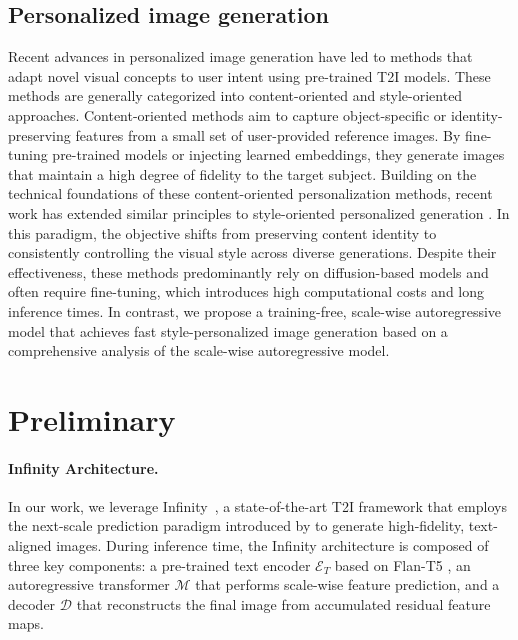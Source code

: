 \documentclass[10pt,twocolumn,letterpaper]{article}
\begin{document}
\subsection{Personalized image generation}
Recent advances in personalized image generation have led to methods that adapt novel visual concepts to user intent using pre-trained T2I models. These methods are generally categorized into content-oriented and style-oriented approaches. Content-oriented methods \cite{ruiz2023dreambooth, li2023blip, wei2023elite, li2024photomaker} aim to capture object-specific or identity-preserving features from a small set of user-provided reference images. By fine-tuning pre-trained models or injecting learned embeddings, they generate images that maintain a high degree of fidelity to the target subject.
Building on the technical foundations of these content-oriented personalization methods, recent work has extended similar principles to style-oriented personalized generation \cite{sohn2023styledrop, frenkel2024implicitstylecontentseparationusing, shah2023ziplorasubjectstyleeffectively, hertz2024stylealignedimagegeneration, ryu2023low, zhang2024finestyle, ahn2024dreamstyler, park2025training}. In this paradigm, the objective shifts from preserving content identity to consistently controlling the visual style across diverse generations.
Despite their effectiveness, these methods predominantly rely on diffusion-based models and often require fine-tuning, which introduces high computational costs and long inference times. In contrast, we propose a training-free, scale-wise autoregressive model that achieves fast style-personalized image generation based on a comprehensive analysis of the scale-wise autoregressive model.




\section{Preliminary}
\label{sec: preliminary}


\paragraph{Infinity Architecture.}
In our work, we leverage Infinity~\cite{han2025infinity}, a state-of-the-art T2I framework that employs the next-scale prediction paradigm introduced by \cite{tian2024visual} to generate high-fidelity, text-aligned images.
During inference time, the Infinity architecture is composed of three key components: a pre-trained text encoder $\mathcal{E}_T$ based on Flan-T5 \cite{chung2022scalinginstructionfinetunedlanguagemodels}, an autoregressive transformer $\mathcal{M}$ that performs scale-wise feature prediction, and a decoder $\mathcal{D}$ that reconstructs the final image from accumulated residual feature maps.
\end{document}
